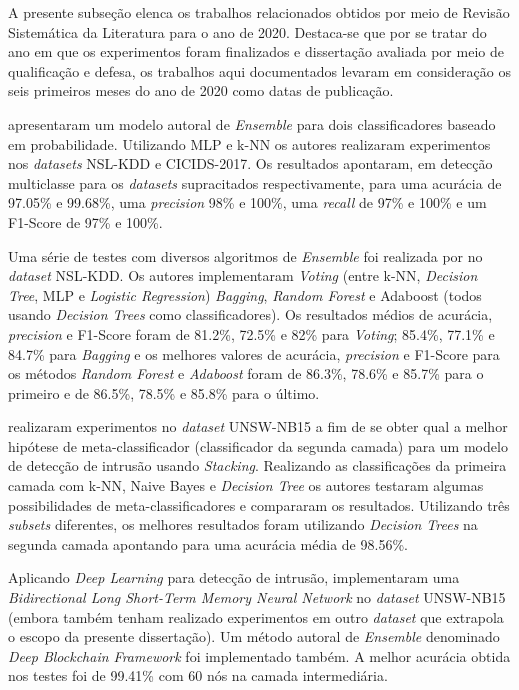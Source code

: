 A presente subseção elenca os trabalhos relacionados obtidos por meio de Revisão Sistemática da Literatura para o ano de 2020. Destaca-se que por se tratar do ano em que os experimentos foram finalizados e dissertação avaliada por meio de qualificação e defesa, os trabalhos aqui documentados levaram em consideração os seis primeiros meses do ano de 2020 como datas de publicação.

 apresentaram um modelo autoral de \textit{Ensemble} para dois classificadores baseado em probabilidade. Utilizando MLP e k-NN os autores realizaram experimentos nos \textit{datasets} NSL-KDD e CICIDS-2017. Os resultados apontaram, em detecção multiclasse para os \textit{datasets} supracitados respectivamente, para uma acurácia de 97.05\% e 99.68\%, uma \textit{precision} 98\% e 100\%, uma \textit{recall} de 97\% e 100\% e um F1-Score de 97\% e 100\%.

Uma série de testes com diversos algoritmos de \textit{Ensemble} foi realizada por  no \textit{dataset} NSL-KDD. Os autores implementaram \textit{Voting} (entre k-NN, \textit{Decision Tree}, MLP e \textit{Logistic Regression}) \textit{Bagging}, \textit{Random Forest} e Adaboost (todos usando \textit{Decision Trees} como classificadores). Os resultados médios de acurácia, \textit{precision} e F1-Score foram de 81.2\%, 72.5\% e 82\% para \textit{Voting}; 85.4\%, 77.1\% e 84.7\% para \textit{Bagging} e os melhores valores de acurácia, \textit{precision} e F1-Score para os métodos \textit{Random Forest} e \textit{Adaboost} foram de 86.3\%, 78.6\% e 85.7\% para o primeiro e de 86.5\%, 78.5\% e 85.8\% para o último.


 realizaram experimentos no \textit{dataset} UNSW-NB15 a fim de se obter qual a melhor hipótese de meta-classificador (classificador da segunda camada) para um modelo de detecção de intrusão usando \textit{Stacking}. Realizando as classificações da primeira camada com k-NN, Naive Bayes e \textit{Decision Tree} os autores testaram algumas possibilidades de meta-classificadores e compararam os resultados. Utilizando três \textit{subsets} diferentes, os melhores resultados foram utilizando \textit{Decision Trees} na segunda camada apontando para uma acurácia média de 98.56\%.


Aplicando \textit{Deep Learning} para detecção de intrusão,  implementaram uma \textit{Bidirectional Long Short-Term Memory Neural Network} no \textit{dataset} UNSW-NB15 (embora também tenham realizado experimentos em outro \textit{dataset} que extrapola o escopo da presente dissertação). Um método autoral de \textit{Ensemble} denominado \textit{Deep Blockchain Framework} foi implementado também. A melhor acurácia obtida nos testes foi de 99.41\% com 60 nós na camada intermediária.

